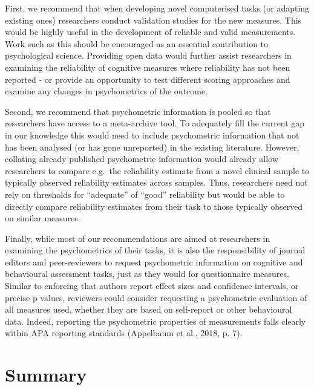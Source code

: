 \documentclass[english,,man,floatsintext]{apa6}
\begin{document}
First, we recommend that when developing novel computerised tasks (or adapting existing ones) researchers conduct validation studies for the new measures. This would be highly useful in the development of reliable and valid measurements. Work such as this should be encouraged as an essential contribution to psychological science. Providing open data would further assist researchers in examining the reliability of cognitive measures where reliability has not been reported - or provide an opportunity to test different scoring approaches and examine any changes in psychometrics of the outcome.

Second, we recommend that psychometric information is pooled so that researchers have access to a meta-archive tool. To adequately fill the current gap in our knowledge this would need to include psychometric information that not has been analysed (or has gone unreported) in the existing literature. However, collating already published psychometric information would already allow researchers to compare e.g.~the reliability estimate from a novel clinical sample to typically observed reliability estimates across samples. Thus, researchers need not rely on thresholds for \enquote{adequate} of \enquote{good} reliability but would be able to directly compare reliability estimates from their task to those typically observed on similar measures.

Finally, while most of our recommendations are aimed at researchers in examining the psychometrics of their tasks, it is also the responsibility of journal editors and peer-reviewers to request psychometric information on cognitive and behavioural assessment tasks, just as they would for questionnaire measures. Similar to enforcing that authors report effect sizes and confidence intervals, or precise p values, reviewers could consider requesting a psychometric evaluation of all measures used, whether they are based on self-report or other behavioural data. Indeed, reporting the psychometric properties of measurements falls clearly within APA reporting standards (Appelbaum et al., 2018, p. 7).

\hypertarget{summary}{%
\section{Summary}\label{summary}}
\end{document}
